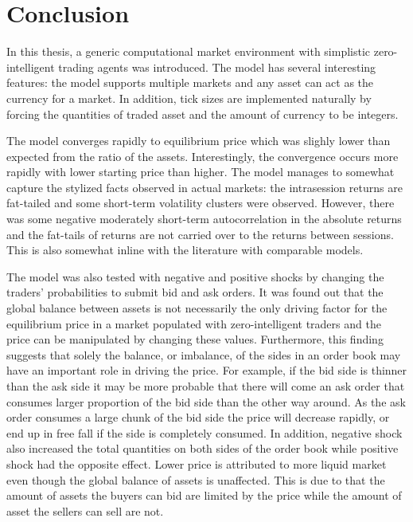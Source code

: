 

\section{Conclusion}

In this thesis, a generic computational market environment with simplistic
zero-intelligent trading agents was introduced. The model has several interesting features: 
the model supports multiple markets and any asset can act as the currency
for a market. In addition, tick sizes are implemented naturally by forcing
the quantities of traded asset and the amount of currency to be integers.

The model converges rapidly to equilibrium price which was slighly lower
than expected from the ratio of the assets. Interestingly, the convergence
occurs more rapidly with lower starting price than higher. The model manages 
to somewhat capture the stylized facts observed in actual markets: the intrasession 
returns are fat-tailed and some short-term volatility clusters were observed. 
However, there was some negative moderately short-term autocorrelation in the 
absolute returns and the fat-tails of returns are not carried over to the returns between sessions. 
This is also somewhat inline with the literature with comparable models.

The model was also tested with negative and positive shocks by changing the 
traders' probabilities to submit bid and ask orders. It was found out that
the global balance between assets is not necessarily the only driving factor for the 
equilibrium price in a market populated with zero-intelligent traders 
and the price can be manipulated by changing these values. Furthermore, this finding suggests that 
solely the balance, or imbalance, of the sides in an order book may have an important role in 
driving the price. For example, if the bid side is thinner than the ask side it may be more probable 
that there will come an ask order that consumes larger proportion of the bid side than the other way 
around. As the ask order consumes a large chunk of the bid side the price will decrease rapidly, 
or end up in free fall if the side is completely consumed. In addition, negative shock
also increased the total quantities on both sides of the order book while
positive shock had the opposite effect. Lower price is attributed to 
more liquid market even though the global balance of assets is unaffected.
This is due to that the amount of assets the buyers can bid are limited by the 
price while the amount of asset the sellers can sell are not. 

